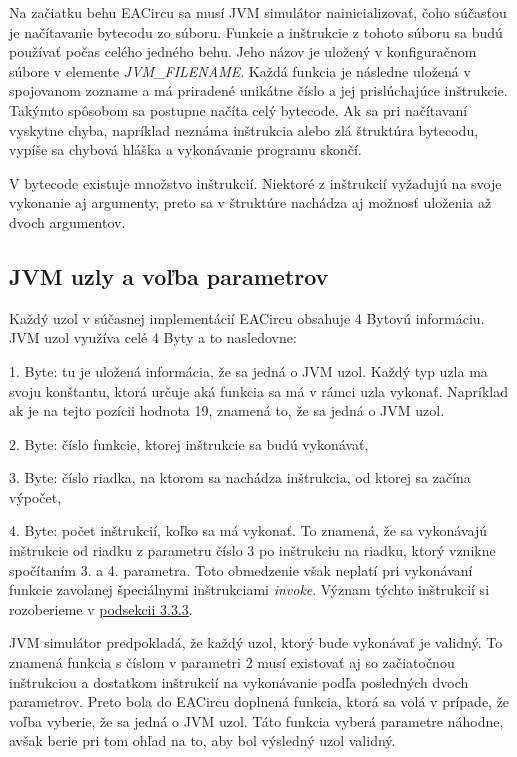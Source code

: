 Na začiatku behu EACircu sa musí JVM simulátor nainicializovať, čoho súčasťou je načítavanie bytecodu zo súboru. Funkcie a inštrukcie z tohoto súboru sa budú používať počas celého jedného behu. Jeho názov je uložený v konfiguračnom súbore v elemente \textit{JVM\_FILENAME}. Každá funkcia je následne uložená v spojovanom zozname a má priradené unikátne číslo a jej prislúchajúce inštrukcie. Takýmto spôsobom sa postupne načíta celý bytecode. Ak sa pri načítavaní vyskytne chyba, napríklad neznáma inštrukcia alebo zlá štruktúra bytecodu, vypíše sa chybová hláška a vykonávanie programu skončí.

V bytecode existuje množstvo inštrukcií. Niektoré z inštrukcií vyžadujú na svoje vykonanie aj argumenty, preto sa v štruktúre nachádza aj možnosť uloženia až dvoch argumentov.

\subsection{JVM uzly a voľba parametrov}
\label{subsec:jvm-nodes}

Každý uzol v súčasnej implementácií EACircu obsahuje 4 Bytovú informáciu. JVM uzol využíva celé 4 Byty a to nasledovne: \vspace{0pt}

\begin{myItemize}
	\item 1. Byte: tu je uložená informácia, že sa jedná o JVM uzol. Každý typ uzla ma svoju konštantu, ktorá určuje aká funkcia sa má v rámci uzla vykonať. Napríklad ak je na tejto pozícii hodnota 19, znamená to, že sa jedná o JVM uzol.
	\item 2. Byte: číslo funkcie, ktorej inštrukcie sa budú vykonávať,
	\item 3. Byte: číslo riadka, na ktorom sa nachádza inštrukcia, od ktorej sa začína výpočet,
	\item 4. Byte: počet inštrukcií, koľko sa má vykonať. To znamená, že sa vykonávajú inštrukcie od riadku z parametru číslo 3 po inštrukciu na riadku, ktorý vznikne spočítaním 3. a 4. parametra. Toto obmedzenie však neplatí pri vykonávaní funkcie zavolanej špeciálnymi inštrukciami \textit{invoke}. Význam týchto inštrukcií si rozoberieme v \hyperref[subsec:emulating-ins]{podsekcii 3.3.3}.
\end{myItemize}
JVM simulátor predpokladá, že každý uzol, ktorý bude vykonávať je validný. To znamená funkcia s číslom v parametri 2 musí existovať aj so začiatočnou inštrukciou a dostatkom inštrukcií na vykonávanie podľa posledných dvoch parametrov. Preto bola do EACircu doplnená funkcia, ktorá sa volá v prípade, že voľba vyberie, že sa jedná o JVM uzol. Táto funkcia vyberá parametre náhodne, avšak berie pri tom ohľad na to, aby bol výsledný uzol validný.

